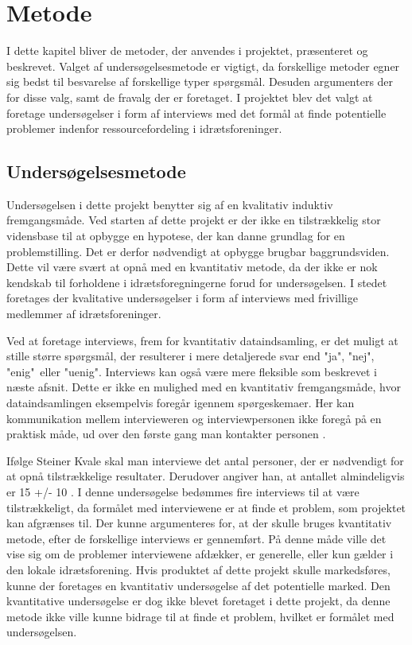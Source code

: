 \chapter{Metode}\label{ch:chlabel}
I dette kapitel bliver de metoder, der anvendes i projektet, præsenteret og beskrevet. Valget af undersøgelsesmetode er vigtigt, da forskellige metoder egner sig bedst til besvarelse af forskellige typer spørgsmål. Desuden argumenters der for disse valg, samt de fravalg der er foretaget. I projektet blev det valgt at foretage undersøgelser i form af interviews med det formål at finde potentielle problemer indenfor ressourcefordeling i idrætsforeninger.

\section{Undersøgelsesmetode}
Undersøgelsen i dette projekt benytter sig af en kvalitativ induktiv fremgangsmåde. Ved starten af dette projekt er der ikke en tilstrækkelig stor vidensbase til at opbygge en hypotese, der kan danne grundlag for en problemstilling. Det er derfor nødvendigt at opbygge brugbar baggrundsviden. Dette vil være svært at opnå med en kvantitativ metode, da der ikke er nok kendskab til forholdene i idrætsforegningerne forud for undersøgelsen. I stedet foretages der kvalitative undersøgelser i form af interviews med frivillige medlemmer af idrætsforeninger.
\par
Ved at foretage interviews, frem for kvantitativ dataindsamling, er det muligt at stille større spørgsmål, der resulterer i mere detaljerede svar end "ja", "nej", "enig"\ eller "uenig". Interviews kan også være mere fleksible som beskrevet i næste afsnit. Dette er ikke en mulighed med en kvantitativ fremgangsmåde, hvor dataindsamlingen eksempelvis foregår igennem spørgeskemaer. Her kan kommunikation mellem intervieweren og interviewpersonen ikke foregå på en praktisk måde, ud over den første gang man kontakter personen \citep{kvale2015}.
\par
Ifølge Steiner Kvale skal man interviewe det antal personer, der er nødvendigt for at opnå tilstrækkelige resultater. Derudover angiver han, at antallet almindeligvis er 15 +/- 10 \cite{kvale2015}. I denne undersøgelse bedømmes fire interviews til at være tilstrækkeligt, da formålet med interviewene er at finde et problem, som projektet kan afgrænses til. Der kunne argumenteres for, at der skulle bruges kvantitativ metode, efter de forskellige interviews er gennemført. På denne måde ville det vise sig om de problemer interviewene afdækker, er generelle, eller kun gælder i den lokale idrætsforening. Hvis produktet af dette projekt skulle markedsføres, kunne der foretages en kvantitativ undersøgelse af det potentielle marked. Den kvantitative undersøgelse er dog ikke blevet foretaget i dette projekt, da denne metode ikke ville kunne bidrage til at finde et problem, hvilket er formålet med undersøgelsen.
